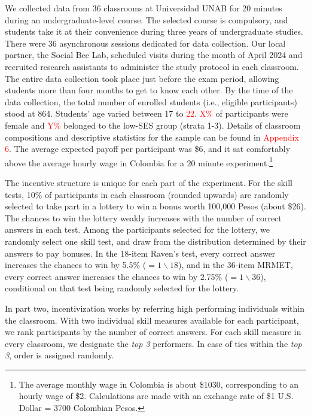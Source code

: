 \documentclass[11pt,a4paper,oneside]{article}
\begin{document}
We collected data from 36 classrooms at Universidad UNAB for 20 minutes during an undergraduate-level course. The selected course is compulsory, and students take it at their convenience during three years of undergraduate studies. There were 36 asynchronous sessions dedicated for data collection. Our local partner, the Social Bee Lab, scheduled visits during the month of  April 2024 and recruited research assistants to administer the study protocol in each classroom. The entire data collection took place just before the exam period, allowing students more than four months to get to know each other. By the time of the data collection, the total number of enrolled students (i.e., eligible participants) stood at 864. Students' age varied between 17 to \textcolor{red}{22}. \textcolor{red}{X\%} of participants were female and \textcolor{red}{Y\%} belonged to the low-SES group (strata 1-3). Details of classroom compositions and descriptive statistics for the sample can be found in \textcolor{red}{Appendix 6}. The average expected payoff per participant was \$6, and it sat comfortably above the average hourly wage in Colombia for a 20 minute experiment.\footnote{The average monthly wage in Colombia is about \$1030, corresponding to an hourly wage of \$2. Calculations are made with an exchange rate of \$1 U.S. Dollar = 3700 Colombian Pesos.}

The incentive structure is unique for each part of the experiment. For the skill tests, 10\% of participants in each classroom (rounded upwards) are randomly selected to take part in a lottery to win a bonus worth 100,000 Pesos (about \$26). The chances to win the lottery weakly increases with the number of correct answers in each test. Among the participants selected for the lottery, we randomly select one skill test, and draw from the distribution determined by their answers to pay bonuses. In the 18-item Raven's test, every correct answer increases the chances to win by 5.5\% ($=1\backslash18$), and in the 36-item MRMET, every correct answer increases the chances to win by 2.75\% ($=1\backslash36$), conditional on that test being randomly selected for the lottery. 

In part two, incentivization works by referring high performing individuals within the classroom. With two individual skill measures available for each participant, we rank participants by the number of correct answers. For each skill measure in every classroom, we designate the \textit{top 3} performers. In case of ties within the \textit{top 3}, order is assigned randomly. 
\end{document}
